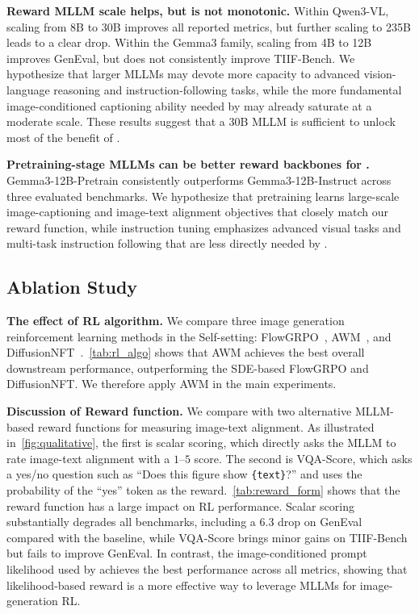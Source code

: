 \noindent \textbf{Reward MLLM scale helps, but is not monotonic.}
Within Qwen3-VL, scaling from 8B to 30B improves all reported metrics, 
but further scaling to 235B leads to a clear drop. 
Within the Gemma3 family, scaling from 4B to 12B improves GenEval, but does not consistently improve TIIF-Bench. 
We hypothesize that larger MLLMs may devote more capacity to 
advanced vision-language reasoning and instruction-following tasks, 
while the more fundamental image-conditioned captioning ability needed by \method may already saturate at a moderate scale. 
These results suggest that a 30B MLLM is sufficient to unlock most of the benefit of \method.

\noindent \textbf{Pretraining-stage MLLMs can be better reward backbones for \method.}
Gemma3-12B-Pretrain consistently outperforms Gemma3-12B-Instruct across three evaluated benchmarks.
We hypothesize that pretraining learns large-scale image-captioning and image-text alignment objectives that closely match
our reward function, while instruction tuning emphasizes advanced visual tasks and multi-task instruction following
that are less directly needed by \method. 

\subsection{Ablation Study}
\label{sec:ablation}

\noindent \textbf{The effect of RL algorithm.}
\label{sec:ablation_algo}
We compare three image generation reinforcement learning methods in the Self-\method setting:
FlowGRPO~\citep{flowgrpo}, AWM~\citep{awm}, and DiffusionNFT~\citep{diffusionnft}.~\autoref{tab:rl_algo} shows that AWM achieves the best overall downstream performance, outperforming the SDE-based FlowGRPO and DiffusionNFT.
We therefore apply AWM in the main experiments.

\noindent \textbf{Discussion of Reward function.}
\label{sec:ablation_reward_form}
We compare \method with two alternative MLLM-based reward functions for measuring image-text alignment.
As illustrated in~\autoref{fig:qualitative}, the first is scalar scoring,
which directly asks the MLLM to rate image-text alignment with a $1$--$5$ score. 
The second is VQA-Score, which asks a yes/no question such as ``Does this figure show \texttt{\{text\}}?'' and uses the
probability of the ``yes'' token as the reward.~\autoref{tab:reward_form} shows that the reward function has a large impact on RL performance.
Scalar scoring substantially degrades all benchmarks, including a $6.3$ drop on GenEval compared with the baseline, 
while VQA-Score brings minor gains on TIIF-Bench but fails to improve GenEval.
In contrast, the image-conditioned prompt likelihood used by \method
achieves the best performance across all metrics, showing that
likelihood-based reward is a more effective way to leverage MLLMs for
image-generation RL.

